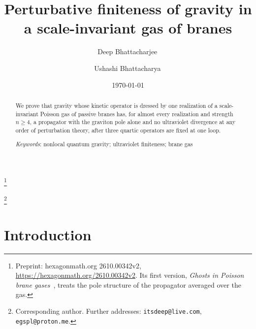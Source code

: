 \documentclass[aps,prd,10pt,twocolumn,superscriptaddress,nofootinbib,floatfix,longbibliography]{revtex4-2}
\begin{document}
\title{Perturbative finiteness of gravity in a scale-invariant gas of branes}
\thanks{Preprint: hexagonmath.org 2610.00342v2, \url{https://hexagonmath.org/2610.00342v2}. Its first version, \textit{Ghosts in Poisson brane gases}~\cite{BhattacharjeeBhattacharya2026}, treats the pole structure of the propagator averaged over the gas.}

\author{Deep Bhattacharjee\,}
\thanks{Corresponding author. Further addresses: \nolinkurl{itsdeep@live.com}, \nolinkurl{egspl@proton.me}.}

\author{Ushashi Bhattacharya\,}

\date{\today}

\begin{abstract}
We prove that gravity whose kinetic operator is dressed by one realization of a scale-invariant Poisson gas of passive branes has, for almost every realization and strength $n\ge4$, a propagator with the graviton pole alone and no ultraviolet divergence at any order of perturbation theory, after three quartic operators are fixed at one loop.
\par\medskip\noindent\textit{Keywords}: nonlocal quantum gravity; ultraviolet finiteness; brane gas
\end{abstract}

\maketitle

\section{Introduction}
\label{sec:intro}
\end{document}
